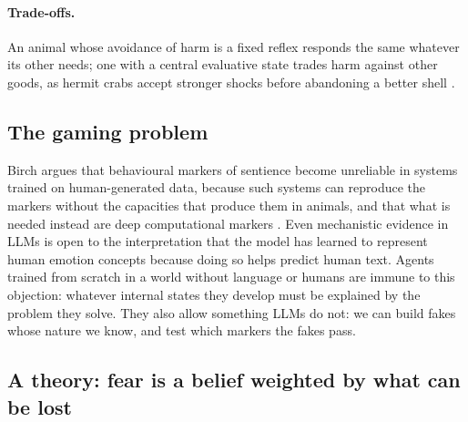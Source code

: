 \documentclass[11pt]{article}
\begin{document}
\paragraph{Trade-offs.} An animal whose avoidance of harm is a fixed reflex responds the same whatever its other needs; one with a central evaluative state trades harm against other goods, as hermit crabs accept stronger shocks before abandoning a better shell \cite{elwood2009hermit}.

\subsection{The gaming problem}

Birch argues that behavioural markers of sentience become unreliable in systems trained on human-generated data, because such systems can reproduce the markers without the capacities that produce them in animals, and that what is needed instead are deep computational markers \cite{birch2024edge}. Even mechanistic evidence in LLMs \cite{anthropic2026emotion,tagliabue2026pain} is open to the interpretation that the model has learned to represent human emotion concepts because doing so helps predict human text. Agents trained from scratch in a world without language or humans are immune to this objection: whatever internal states they develop must be explained by the problem they solve. They also allow something LLMs do not: we can build fakes whose nature we know, and test which markers the fakes pass.

\subsection{A theory: fear is a belief weighted by what can be lost}
\label{sec:theory}
\end{document}
